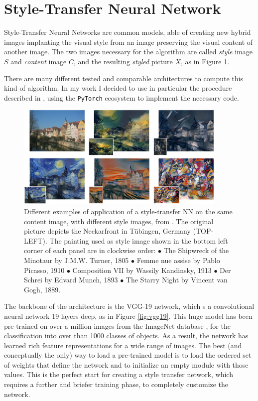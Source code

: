 
\section{Style-Transfer Neural Network} \label{ssec:sttrNN}
    Style-Transfer Neural Networks are common models, able of creating new hybrid images implanting the visual style from an image preserving the visual content of another image. The two images necessary for the algorithm are called \textit{style} image $S$ and \textit{content} image $C$, and the resulting \textit{styled} picture $X$, as in Figure \ref{fig:ex_st_tr}.

    There are many different tested and comparable architectures to compute this kind of algorithm. In my work I decided to use in particular the procedure described in \cite{1508.06576}, using the \texttt{PyTorch} ecosystem to implement the necessary code.

    \begin{figure}
        \centering
        \includegraphics[width = 0.9\textwidth]{images/st_trasf_ex}
        \caption{Different examples of application of a style-transfer NN on the same content image, with different style images, from \cite{1508.06576}. The
    original picture depicts the Neckarfront in Tübingen, Germany (TOP-LEFT). The painting used as style image shown in the bottom left corner of each panel are in clockwise order: $\bullet$ The Shipwreck of the Minotaur by J.M.W. Turner, 1805 $\bullet$ Femme nue assise by Pablo Picasso, 1910 $\bullet$ Composition VII by Wassily Kandinsky, 1913 $\bullet$ Der Schrei by Edvard Munch, 1893 $\bullet$ The Starry Night by Vincent van Gogh, 1889.}
        \label{fig:ex_st_tr}
    \end{figure}

    The backbone of the architecture is the VGG-19 network, which s a convolutional neural network 19 layers deep, as in Figure \ref{fig:vgg19}. This huge model has been pre-trained on over a million images from the ImageNet database \cite{imagenet_cvpr09}, for the classification into over than 1000 classes of objects. As a result, the network has learned rich feature representations for a wide range of images. The best (and conceptually the only) way to load a pre-trained model is to load the ordered set of weights that define the network and to initialize an empty module with those values. This is the perfect start for creating a style transfer network, which requires a further and briefer training phase, to completely customize the network.

